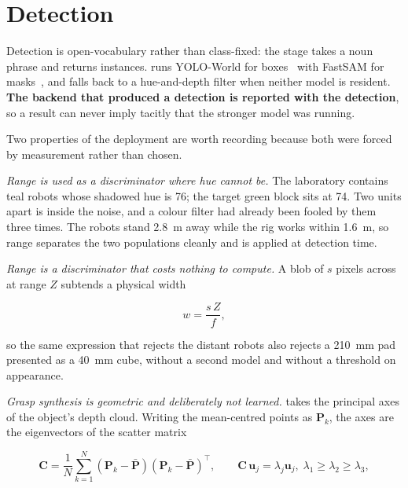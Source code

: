 \section{Detection}

Detection is open-vocabulary rather than class-fixed: the stage takes a noun
phrase and returns instances.  runs
YOLO-World for boxes~\cite{cheng2024yoloworld} with FastSAM for
masks~\cite{zhao2023fastsam}, and falls back to a hue-and-depth filter when
neither model is resident. \textbf{The backend that produced a detection is
reported with the detection}, so a result can never imply tacitly that the
stronger model was running.

Two properties of the deployment are worth recording because both were forced
by measurement rather than chosen.

\emph{Range is used as a discriminator where hue cannot be.} The laboratory
contains teal robots whose shadowed hue is \num{76}; the target green block
sits at \num{74}. Two units apart is inside the noise, and a colour filter had
already been fooled by them three times. The robots stand \SI{2.8}{\metre}
away while the rig works within \SI{1.6}{\metre}, so range separates the two
populations cleanly and is applied at detection time.

\emph{Range is a discriminator that costs nothing to compute.} A blob of $s$
pixels across at range $Z$ subtends a physical width

\begin{equation}
  \label{eq:size-at-range}
  w = \frac{s\,Z}{f},
\end{equation}

so the same expression that rejects the distant robots also rejects a
\SI{210}{\milli\metre} pad presented as a \SI{40}{\milli\metre} cube, without
a second model and without a threshold on appearance.

\emph{Grasp synthesis is geometric and deliberately not learned.}
 takes the principal axes of the object's
depth cloud. Writing the mean-centred points as $\mathbf{P}_k$, the axes are
the eigenvectors of the scatter matrix

\begin{equation}
  \label{eq:pca}
  \mathbf{C} = \frac{1}{N}\sum_{k=1}^{N}
    (\mathbf{P}_k - \bar{\mathbf{P}})(\mathbf{P}_k - \bar{\mathbf{P}})^{\!\top},
  \qquad
  \mathbf{C}\,\mathbf{u}_j = \lambda_j \mathbf{u}_j,
  \; \lambda_1 \ge \lambda_2 \ge \lambda_3 ,
\end{equation}


